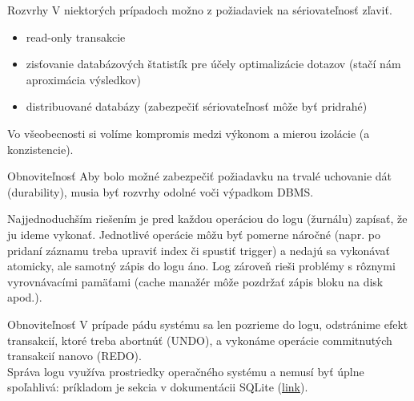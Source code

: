 \documentclass[12pt]{beamer}
\begin{document}
\begin{frame}[fragile]{Rozvrhy}
V niektorých prípadoch možno z požiadaviek na sériovateľnosť zľaviť.
\begin{itemize}
\item read-only transakcie
\item zisťovanie databázových štatistík pre účely optimalizácie dotazov (stačí nám aproximácia výsledkov)
\item distribuované databázy (zabezpečiť sériovateľnosť môže byť pridrahé)
\end{itemize}
Vo všeobecnosti si volíme kompromis medzi výkonom a mierou izolácie (a konzistencie).
\end{frame}


\begin{frame}[fragile]{Obnoviteľnosť}
Aby bolo možné zabezpečiť požiadavku na trvalé uchovanie dát (durability), musia byť rozvrhy odolné voči výpadkom DBMS.

Najjednoduchším riešením je pred každou operáciou do logu (žurnálu) zapísať,
že ju ideme vykonať.
Jednotlivé operácie môžu byť pomerne náročné (napr. po pridaní záznamu treba upraviť index či spustiť trigger)
a nedajú sa vykonávať atomicky, ale samotný zápis do logu áno.
Log zároveň rieši problémy s rôznymi vyrovnávacími pamäťami (cache manažér môže pozdržať zápis bloku na disk apod.).
\end{frame}


\begin{frame}[fragile]{Obnoviteľnosť}
V prípade pádu systému sa len pozrieme do logu,
odstránime efekt transakcií, ktoré treba abortnúť (UNDO), a vykonáme operácie commitnutých transakcií nanovo (REDO).
\\[3mm]

Správa logu využíva prostriedky operačného systému a nemusí byť úplne spoľahlivá: príkladom je sekcia
 v dokumentácii SQLite
(\href{https://www.sqlite.org/lockingv3.html#rollback}{link}).
\end{frame}
\end{document}
